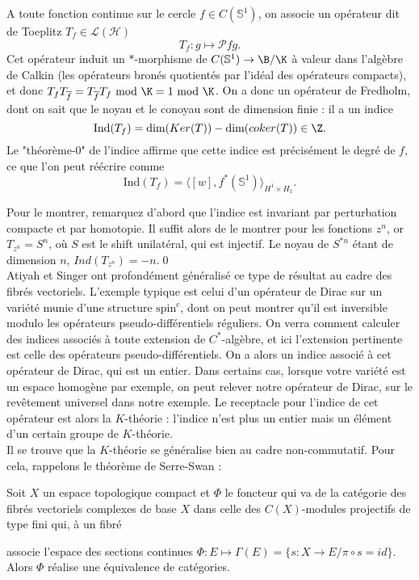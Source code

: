 A toute fonction continue sur le cercle $f\in C(\mathbb S^1)$, on associe un opérateur dit de Toeplitz $T_f\in \mathcal L(\mathcal H)$
\[T_f : g \mapsto \mathcal P fg. \]
Cet opérateur induit un $*$-morphisme de $C(\mathbb S^1)\rightarrow \B/\K$ à valeur dans l'algèbre de Calkin (les opérateurs bronés quotientés par l'idéal des opérateurs compacts), et donc $T_f T_{\overline f}= T_{\overline f} T_f \ \text{mod}\ \K  = 1 \ \text{mod}\ \K$. On a donc un opérateur de Fredholm, dont on sait que le noyau et le conoyau sont de dimension finie : il a un indice
\[\text{Ind}(T_f)=\text{dim}(Ker(T))- \text{dim} (coker(T))\in \Z.\]
Le "théorème-$0$" de l'indice affirme que cette indice est précisément le degré de $f$, ce que l'on peut réécrire comme 
\[\text{Ind}(T_f)= \langle [w],f^*(\mathbb S^1)\rangle_{H^1\times H_1}.\]

Pour le montrer, remarquez d'abord que l'indice est invariant par perturbation compacte et par homotopie. Il suffit alors de le montrer pour les fonctions $z^n$, or $T_{z^n}=S^n$, où $S$ est le shift unilatéral, qui est injectif. Le noyau de $S^{*n}$ étant de dimension $n$, $Ind(T_{z^n})=-n$.\qed \\

Atiyah et Singer ont profondément généralisé ce type de résultat au cadre des fibrés vectoriels. L'exemple typique est celui d'un opérateur de Dirac  sur un variété munie d'une structure $\text{spin}^c$, dont on peut montrer qu'il est inversible modulo les opérateurs pseudo-différentiels réguliers. On verra comment calculer des indices associés à toute extension de $C^*$-algèbre, et ici l'extension pertinente est celle des opérateurs pseudo-différentiels. On a alors un indice associé à cet opérateur de Dirac, qui est un entier. Dans certains cas, lorsque votre variété est un espace homogène par exemple, on peut relever notre opérateur de Dirac, sur le revêtement universel dans notre exemple. Le receptacle pour l'indice de cet opérateur est alors la $K$-théorie : l'indice n'est plus un entier mais un élément d'un certain groupe de $K$-théorie.\\

Il se trouve que la $K$-théorie se généralise bien au cadre non-commutatif. Pour cela, rappelons le théorème de Serre-Swan :

\begin{thm}
Soit $X$ un espace topologique compact et $\Phi$ le foncteur qui va de la catégorie des fibrés vectoriels complexes de base $X$ dans celle des $C(X)$-modules projectifs de type fini qui, à un fibré  associe l'espace des sections continues $\Phi : E\mapsto \Gamma(E)=\{s : X\rightarrow E / \pi\circ s = id\}$.\\
Alors $\Phi$ réalise une équivalence de catégories.
\end{thm}

